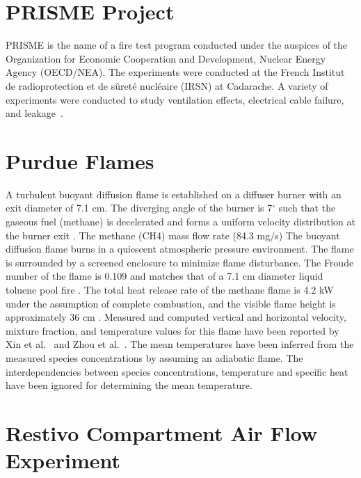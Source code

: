 \section{PRISME Project}

PRISME is the name of a fire test program conducted under the auspices of the Organization for Economic Cooperation and Development, Nuclear Energy Agency (OECD/NEA). The experiments were conducted at the French Institut de radioprotection et de s\^{u}ret\'{e} nucl\'{e}aire (IRSN) at Cadarache. A variety of experiments were conducted to study ventilation effects, electrical cable failure, and leakage~\cite{Dreisbach:Interflam}.

\section{Purdue Flames}

A turbulent buoyant diffusion flame is established on a diffuser burner with an exit diameter of 7.1 cm. The diverging angle of the burner is 7$^\circ$ such that the gaseous fuel (methane) is decelerated and forms a uniform velocity distribution at the burner exit \cite{Xin:CF2005}. The methane (CH4) mass flow rate (84.3 mg/s) The buoyant diffusion flame burns in a quiescent atmospheric pressure environment. The flame is surrounded by a screened enclosure to minimize flame disturbance. The Froude number of the flame is 0.109 and matches that of a 7.1 cm diameter liquid toluene pool fire \cite{Xin:CF2005,Zhou:CS1998}. The total heat release rate of the methane flame is 4.2 kW under the assumption of complete combustion, and the visible flame height is approximately 36 cm \cite{Xin:CF2005}. Measured and computed vertical and horizontal velocity, mixture fraction, and temperature values for this flame have been reported by Xin et al.~\cite{Xin:CF2005,Xin:PhD2002} and Zhou et al.~\cite{Zhou:CS1998,Zhou:PurduePhD1999}. The mean temperatures have been inferred from the measured species concentrations \cite{Xin:CF2005} by assuming an adiabatic flame. The interdependencies between species concentrations, temperature and specific heat have been ignored for determining the mean temperature.

\section{Restivo Compartment Air Flow Experiment}

